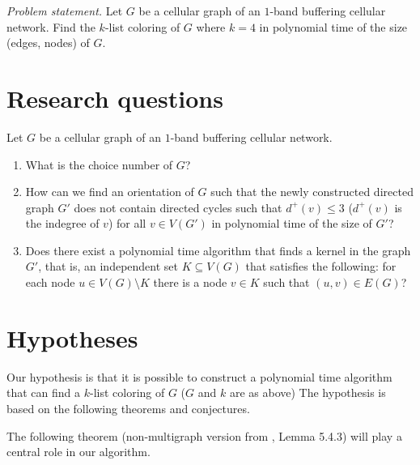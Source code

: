 \documentclass[letterpaper, 10 pt, conference]{ieeeconf}  %
\begin{document}
\textit{Problem statement.} Let $G$ be a cellular graph of an $1$-band buffering cellular network. Find the $k$-list coloring of $G$ where $k= 4$ in polynomial time of the size (edges, nodes) of $G$.

\section{Research questions}


Let $G$ be a cellular graph of an $1$-band buffering cellular network. 
\begin{enumerate}
\item What is the choice number of $G$?
\item How can we find an orientation of $G$ such that the newly constructed directed graph $G'$ does not contain directed cycles such that $d^+(v) \leqslant 3$ ($d^+(v)$ is the indegree of $v$) for all $v \in V(G')$ in polynomial time of the size of $G'$?
\item Does there exist a polynomial time algorithm that finds a kernel in the graph $G'$, that is, an independent set $K \subseteq V(G)$ that satisfies the following: for each node $u \in V(G) \setminus K$ there is a node $v \in K$ such that $(u,v) \in E(G)$?
\end{enumerate}

\section{Hypotheses}

Our hypothesis is that it is possible to construct a polynomial time algorithm that can find a $k$-list coloring of $G$ ($G$ and $k$ are as above) The hypothesis is based on the following theorems and conjectures.

The following theorem \cite{Galvin:1995:LCI:199352.199369} (non-multigraph version from \cite{citeulike:395714}, Lemma 5.4.3) will play a central role in our algorithm.
\end{document}
